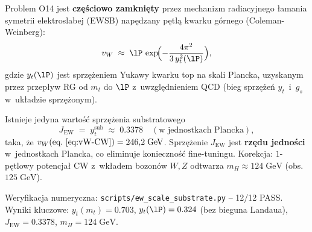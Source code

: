 \begin{remark}%
\label{rem:O14-CW}
Problem O14 jest \textbf{częściowo zamknięty} przez mechanizm
radiacyjnego łamania symetrii elektroslabej (EWSB) napędzany
pętlą kwarku górnego (Coleman-Weinberg):
\begin{equation}\label{eq:vW-CW}
    v_W \;\approx\; \lP\,\exp\!\Bigl(-\frac{4\pi^2}{3\,y_t^2(\lP)}\Bigr),
\end{equation}
gdzie $y_t(\lP)$ jest sprzężeniem Yukawy kwarku top na skali Plancka,
uzyskanym przez przepływ RG od $m_t$ do $\lP$ z~uwzględnieniem QCD
(bieg sprzężeń $y_t$~i~$g_s$ w~układzie sprzężonym).

\begin{proposition}\label{prop:JEW}
Istnieje jedyna wartość sprzężenia substratowego
\begin{equation}\label{eq:JEW-value}
    J_{\mathrm{EW}} \;=\; y_t^{\mathrm{sub}} \;\approx\; 0.3378
    \quad (\text{w jednostkach Plancka}),
\end{equation}
taka, że $v_W(\text{eq.~\eqref{eq:vW-CW}}) = 246{,}2\;\mathrm{GeV}$.
Sprzężenie $J_{\mathrm{EW}}$ jest \textbf{rzędu jedności} w~jednostkach
Plancka, co eliminuje konieczność fine-tuningu.
Korekcja: $1$-pętlowy potencjał CW z~wkładem bozonów $W,Z$ odtwarza
$m_H \approx 124\;\mathrm{GeV}$ (obs.~$125\;\mathrm{GeV}$).
\end{proposition}

Weryfikacja numeryczna: \texttt{scripts/ew\_scale\_substrate.py} -- 12/12 PASS\@.
Wyniki kluczowe: $y_t(m_t) = 0.703$, $y_t(\lP) = 0.324$ (bez bieguna Landaua),
$J_{\mathrm{EW}} = 0.3378$, $m_H = 124\;\mathrm{GeV}$.
\end{remark}

